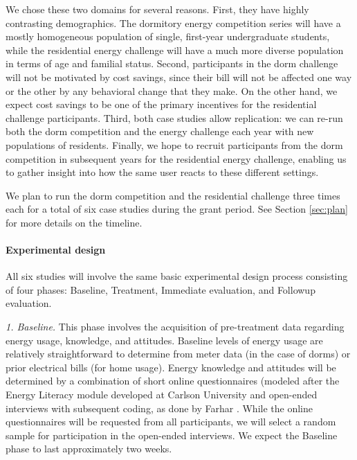 We chose these two domains for several reasons. First, they have highly
contrasting demographics.  The dormitory energy competition series will
have a mostly homogeneous population of single, first-year undergraduate
students, while the residential energy challenge will have a much more
diverse population in terms of age and familial status.  Second,
participants in the dorm challenge will not be motivated by cost savings,
since their bill will not be affected one way or the other by any
behavioral change that they make. On the other hand, we expect cost savings
to be one of the primary incentives for the residential challenge
participants.  Third, both case studies allow replication: we can re-run
both the dorm competition and the energy challenge each year with new
populations of residents.  Finally, we hope to recruit participants from
the dorm competition in subsequent years for the residential energy
challenge, enabling us to gather insight into how the same user reacts to
these different settings. 

We plan to run the dorm competition and the residential challenge three
times each for a total of six case studies during the grant period.  See
Section \ref{sec:plan} for more details on the timeline.

\paragraph{Experimental design}

All six studies will involve the same basic experimental design process
consisting of four phases: Baseline, Treatment, Immediate evaluation, and
Followup evaluation.

{\em 1. Baseline.}  This phase involves the acquisition of
pre-treatment data regarding energy usage, knowledge, and attitudes.
Baseline levels of energy usage are relatively straightforward to determine
from meter data (in the case of dorms) or prior electrical bills (for home
usage).  Energy knowledge and attitudes will be determined by a combination
of short online questionnaires (modeled after the Energy Literacy module
developed at Carlson University \cite{DeWaters09,DeWaters09b} and
open-ended interviews with subsequent coding, as done by Farhar
\cite{Farhar09}. While the online questionnaires will be requested from all
participants, we will select a random sample for participation in the
open-ended interviews.  We expect the Baseline phase to last approximately
two weeks. 

